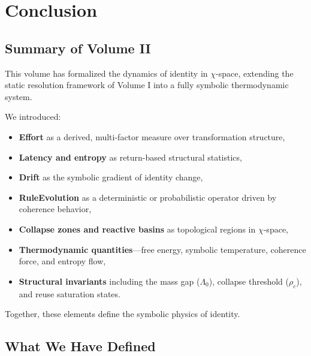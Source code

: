 \chapter{Conclusion}

\section{Summary of Volume II} \label{summary-of-volume-ii}

This volume has formalized the dynamics of identity in $\chi$-space, extending the static resolution framework of Volume I into a fully symbolic thermodynamic system.

\medskip

We introduced:
\begin{itemize}
    \item \textbf{Effort} as a derived, multi-factor measure over transformation structure,
    \item \textbf{Latency and entropy} as return-based structural statistics,
    \item \textbf{Drift} as the symbolic gradient of identity change,
    \item \textbf{RuleEvolution} as a deterministic or probabilistic operator driven by coherence behavior,
    \item \textbf{Collapse zones and reactive basins} as topological regions in $\chi$-space,
    \item \textbf{Thermodynamic quantities}—free energy, symbolic temperature, coherence force, and entropy flow,
    \item \textbf{Structural invariants} including the mass gap ($\Lambda_0$), collapse threshold ($\rho_c$), and reuse saturation states.
\end{itemize}

Together, these elements define the symbolic physics of identity.

\section{What We Have Defined} \label{what-we-have-defined}

